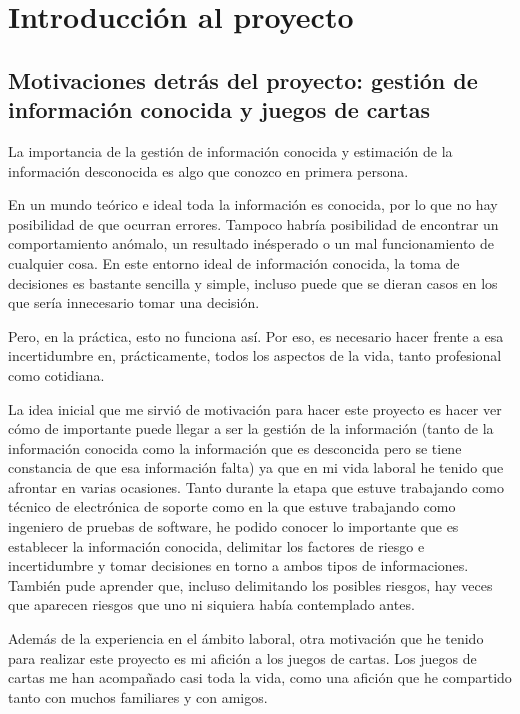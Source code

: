 \chapter{Introducción al proyecto}


\section{Motivaciones detrás del proyecto: gestión de información conocida y juegos de cartas}

La importancia de la gestión de información conocida y estimación de la información desconocida es algo que conozco en primera persona. 

En un mundo teórico e ideal toda la información es conocida, por lo que no hay posibilidad de que ocurran errores. Tampoco habría posibilidad de encontrar un comportamiento anómalo, un resultado inésperado o un mal funcionamiento de cualquier cosa. En este entorno ideal de información conocida, la toma de decisiones es bastante sencilla y simple, incluso puede que se dieran casos en los que sería innecesario tomar una decisión.

Pero, en la práctica, esto no funciona así. Por eso, es necesario hacer frente a esa incertidumbre en, prácticamente, todos los aspectos de la vida, tanto profesional como cotidiana.

La idea inicial que me sirvió de motivación para hacer este proyecto es hacer ver cómo de importante puede llegar a ser la gestión de la información (tanto de la información conocida como la información que es desconcida pero se tiene constancia de que esa información falta) ya que en mi vida laboral he tenido que afrontar en varias ocasiones. 
Tanto durante la etapa que estuve trabajando como técnico de electrónica de soporte como en la que estuve trabajando como ingeniero de pruebas de software, he podido conocer lo importante que es establecer la información conocida, delimitar los factores de riesgo e incertidumbre y tomar decisiones en torno a ambos tipos de informaciones. También pude aprender que, incluso delimitando los posibles riesgos, hay veces que aparecen riesgos que uno ni siquiera había contemplado antes. 

Además de la experiencia en el ámbito laboral, otra motivación que he tenido para realizar este proyecto es mi afición a los juegos de cartas. Los juegos de cartas me han acompañado casi toda la vida, como una afición que he compartido tanto con muchos familiares y con amigos. 

